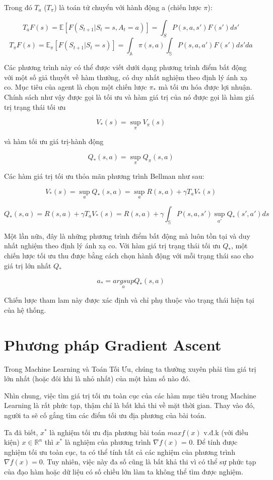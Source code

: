 \documentclass[14pt]{extreport}
\begin{document}
 Trong đó $T_a$ ($T_\pi$) là toán tử chuyển với hành động a (chiến lược $\pi$):
 
$$
 T_a F(s)=\mathbb{E}\left[F(S_{t+1} |S_t = s,A_t =a)\right]= \int _{S} P(s,a,s') F(s') ds'
 $$
$$ T_ \pi F(s)= \mathbb{E}_ \pi [F(S_{t+1} |S_t = s)]= \int _{\mathbb{A} } \pi (s,a) \int _{\mathbb{S}} P(s,a,a') F(s') ds' da
 $$
 
 Các phương trình này có thể được viết dưới dạng phương trình điểm bất động với một số giả thuyết về hàm thưởng, có duy nhất nghiệm theo định lý ánh xạ co. Mục tiêu của agent là chọn một chiến lược $\pi_{*}$ mà tối ưu hóa được lợi nhuận. Chính sách như vậy được gọi là tối ưu và hàm giá trị của nó được gọi là hàm giá trị trạng thái tối ưu
 
$$
 V_{*} (s)= \sup_{\pi} V_\pi (s)
 $$
 
 và hàm tối ưu giá trị-hành động
 
 
 $$Q_{*}(s,a)= \sup _\pi Q_\pi (s,a)$$
 
 Các hàm giá trị tối ưu thỏa mãn phương trình Bellman như sau:
 

 $$V_* (s)= \sup _a Q_* (s,a)=\sup _a {R(s,a)+\gamma T_a V_* (s)}$$
 
 $$Q_*(s,a)=R(s,a)+\gamma T_a V_* (s)=R(s,a)+\gamma \int _{\mathbb{S}}P(s,a,s') \sup _{a'} Q_*(s',a')ds$$

Một lần nữa, đây là những phương trình điểm bất động mà luôn tồn tại và duy nhất nghiệm theo định lý ánh xạ co. Với hàm giá trị trạng thái tối ưu $Q_*$, một chiến lược tối ưu thu được bằng cách chọn hành động với mỗi trạng thái sao cho giá trị lớn nhất $Q_*$


$$a_* = \underset{a}{argsup} Q_*(s,a)$$

Chiến lược tham lam này được xác định và chỉ phụ thuộc vào trạng thái hiện tại của hệ thống.

\section{Phương pháp Gradient Ascent}
Trong Machine Learning và Toán Tối Ưu, chúng ta thường xuyên phải tìm giá trị lớn nhất (hoặc đôi khi là nhỏ nhất) của một hàm số nào đó.

Nhìn chung, việc tìm giá trị tối ưu toàn cục của các hàm mục tiêu trong Machine Learning là rất phức tạp, thậm chí là bất khả thi về mặt thời gian. Thay vào đó, người ta sẽ cố gắng tìm các điểm tối ưu địa phương của bài toán.

Ta đã biết, $x^*$ là nghiệm tối ưu địa phương bài toán $max f(x)$ v.đ.k (với điều kiện) $x\in\mathbb{R}^n$ thì $x^*$ là nghiệm của phương trình $\nabla f(x)$ = 0. Để tính được nghiệm tối ưu toàn cục, ta có thể tính tất cả các nghiệm của phương trình $\nabla f(x) = 0$. Tuy nhiên, việc này đa số cũng là bất khả thi vì có thể sự phức tạp của đạo hàm hoặc dữ liệu có số chiều lớn làm ta không thể tìm được nghiệm.
\end{document}
